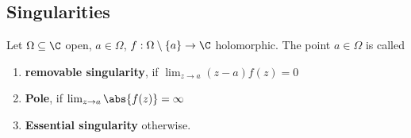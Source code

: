 \subsection{Singularities}
\begin{definition}[]
	Let $\Omega \subseteq \C$ open, $a \in \Omega$, $f: \Omega \setminus \{a\} \to \C$ holomorphic. The point $a \in \Omega$ is called
	\begin{enumerate}
		\item \textbf{removable singularity}, if $\lim_{z \to a}(z-a) f(z) = 0$
		\item \textbf{Pole}, if $\lim_{z \to a}\abs{f(z)} = \infty$
		\item \textbf{Essential singularity} otherwise.
	\end{enumerate}
\end{definition}
